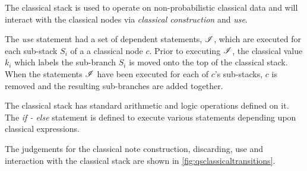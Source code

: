 The classical stack  is used to operate on
non-probabilistic classical data and will interact with the classical nodes
 via \emph{classical construction} and \emph{use}.

The \emph{use} statement had a set of dependent 
statements, $\mathscr{I}$, which are
executed for each sub-stack $S_i$ of a a classical node $c$. Prior to 
executing $\mathscr{I}$, the classical value $k_i$ which labels the 
sub-branch $S_i$ is moved onto the top of the classical stack.
When the statements $\mathscr{I}$ have been executed for each of $c$'s sub-stacks, 
$c$ is removed and the resulting sub-branches are added together.

The classical stack has  standard arithmetic and logic operations defined
on it. The \emph{if - else} statement is defined to execute various 
statements depending upon classical expressions.

The judgements for the classical note construction, discarding, use and
interaction with the classical stack are shown in 
\ref{fig:qsclassicaltransitions}.


